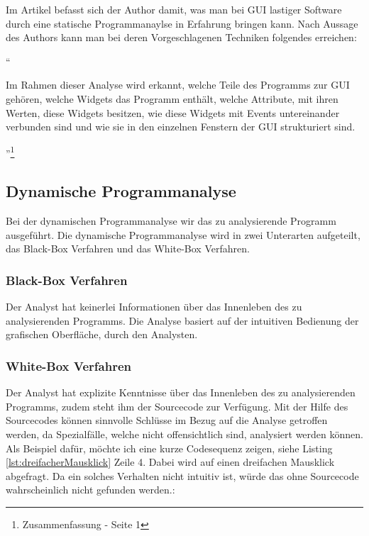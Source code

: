   Im Artikel \cite{GUIAnalysenUndBibliotheken} befasst sich der Author damit,
  was man bei \ac{GUI} lastiger Software durch eine statische Programmanaylse in
  Erfahrung bringen kann. Nach Aussage des Authors kann man bei deren
  Vorgeschlagenen Techniken folgendes erreichen:
  
  ``\begin{itshape}Im Rahmen dieser Analyse wird erkannt, welche Teile des
  Programms zur GUI gehören, welche Widgets das Programm enthält, welche
  Attribute, mit ihren Werten, diese Widgets besitzen, wie diese Widgets mit
  Events untereinander verbunden sind und wie sie in den einzelnen Fenstern der
  GUI strukturiert
  sind.\end{itshape}''\footnote{\cite{GUIAnalysenUndBibliotheken}
  Zusammenfassung - Seite 1}
    
  \subsection{Dynamische Programmanalyse}
  
  Bei der dynamischen Programmanalyse wir das zu analysierende Programm 
  ausgeführt. Die dynamische Programmanalyse wird in zwei Unterarten aufgeteilt,
  das Black-Box Verfahren und das White-Box Verfahren.
    
  \subsubsection{Black-Box Verfahren}
  
  Der Analyst hat keinerlei Informationen über das Innenleben des zu
  analysierenden Programms. Die Analyse basiert auf der intuitiven Bedienung der
  grafischen Oberfläche, durch den Analysten.
  
  \subsubsection{White-Box Verfahren}
  
  Der Analyst hat explizite Kenntnisse über das Innenleben des zu
  analysierenden Programms, zudem steht ihm der Sourcecode zur Verfügung. Mit
  der Hilfe des Sourcecodes können sinnvolle Schlüsse im Bezug auf die Analyse
  getroffen werden, da Spezialfälle, welche nicht offensichtlich sind,
  analysiert werden können. Als Beispiel dafür, möchte ich eine kurze
  Codesequenz zeigen, siehe Listing \ref{lst:dreifacherMausklick} Zeile 4.
  Dabei wird auf einen dreifachen Mausklick abgefragt. Da ein solches Verhalten nicht
  intuitiv ist, würde das ohne Sourcecode wahrscheinlich nicht gefunden werden.:
  \newline
  
